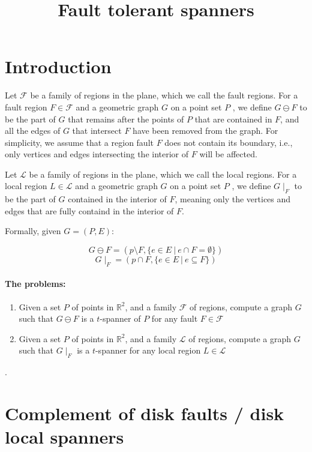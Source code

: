 \documentclass{article}
\title{Fault tolerant spanners}
\newcommand{\R}{\mathbb{R}}
\newcommand{\FF}{\mathcal{F}}
\newcommand{\LL}{\mathcal{L}}
\begin{document}
	
	
	\maketitle
	
	\section{Introduction}
	
	Let $\FF$ be a family of regions in the plane, which we call the fault regions. For a fault region $F\in \FF$ and a geometric graph $G$ on a point set $P$ , we define $G\ominus F$ to be the part of $G$ that remains after the points of $P$ that are contained in $F$, and all the edges of $G$ that intersect $F$ have been removed from the graph. For simplicity, we assume that a region fault $F$ does not contain its boundary, i.e., only vertices and edges intersecting the interior of $F$ will be affected.
	
	
	Let $\LL$ be a family of regions in the plane, which we call the local regions. For a local region $L\in \LL$ and a geometric graph $G$ on a point set $P$ , we define $G\mid_F$ to be the part of $G$ contained in the interior of $F$, meaning only the vertices and edges that are fully containd in the interior of $F$.
	
	Formally, given $G=(P,E)$:
	
	$$G\ominus F = (p\setminus F, \{e\in E~|~ e\cap F = \emptyset\})$$
	$$G\mid_F = (p \cap F, \{e\in E~|~ e\subseteq F\})$$
	
	\paragraph{The problems:}
	\begin{enumerate}
		\item Given a set $P$ of points in $\R^2$, and a family $\FF$ of regions, compute a graph $G$ such that $G\ominus F$ is a $t$-spanner of $P$ for any fault $F\in\FF$
		\item Given a set $P$ of points in $\R^2$, and a family $\LL$ of regions, compute a graph $G$ such that $G\mid_F$ is a $t$-spanner for any local region $L\in\LL$
	\end{enumerate}
	.

	
	\section{Complement of disk faults / disk local spanners}
	
\end{document}
